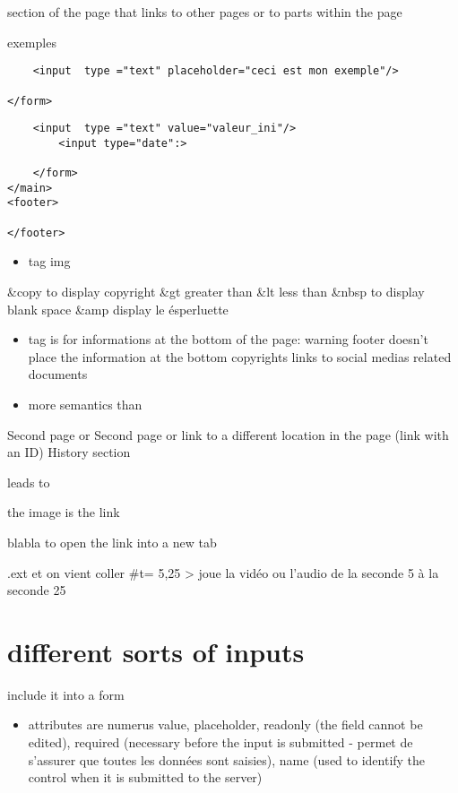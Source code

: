 \documentclass[
]{book}
\providecommand{\tightlist}{%
  \setlength{\itemsep}{0pt}\setlength{\parskip}{0pt}}
\begin{document}
section of the page that links to other pages or to parts within the page

exemples

\begin{verbatim}
    <input  type ="text" placeholder="ceci est mon exemple"/>

</form>
\end{verbatim}

\begin{verbatim}
    <input  type ="text" value="valeur_ini"/>
        <input type="date":>

    </form>
</main>
<footer>

</footer>
\end{verbatim}

\begin{itemize}
\tightlist
\item
  tag img
\end{itemize}

\&copy to display copyright
\&gt greater than
\&lt less than
\&nbsp to display blank space
\&amp display le ésperluette

\begin{itemize}
\item
  tag is for informations at the bottom of the page:
  warning footer doesn't place the information at the bottom
  copyrights
  links to social medias
  related documents
\item
  more semantics than
\end{itemize}

Second page
or Second page
or link to a different location in the page (link with an ID)
History section

leads to

\hypertarget{history}{}

the image is the link

blabla to open the link into a new tab

.ext et on vient coller \#t= 5,25 \textgreater{} joue la vidéo ou l'audio de la seconde 5 à la seconde 25

\hypertarget{different-sorts-of-inputs}{%
\section{different sorts of inputs}\label{different-sorts-of-inputs}}

include it into a form

\begin{itemize}
\tightlist
\item
  attributes are numerus
  value, placeholder, readonly (the field cannot be edited), required (necessary before the input is submitted - permet de s'assurer que toutes les données sont saisies), name (used to identify the control when it is submitted to the server)
\end{itemize}
\end{document}
